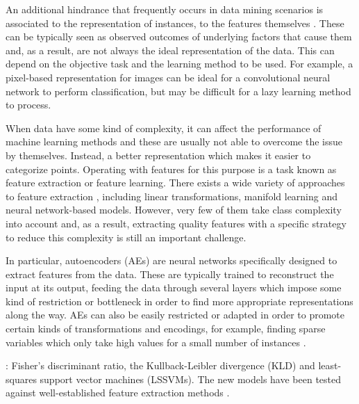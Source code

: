 An additional hindrance that frequently occurs in data mining scenarios is associated to the representation of instances, to the features themselves . These can be typically seen as observed outcomes of underlying factors that cause them and, as a result, are not always the ideal representation of the data. This can depend on the objective task and the learning method to be used. For example, a pixel-based representation for images can be ideal for a convolutional neural network to perform classification, but may be difficult for a lazy learning method to process.

When data have some kind of complexity, it can affect the performance of machine learning methods and these are usually not able to overcome the issue by themselves. Instead,  a better representation which makes it easier to categorize points. Operating with features for this purpose is a task known as feature extraction or feature learning. There exists a wide variety of approaches to feature extraction , including linear transformations, manifold learning and neural network-based models. However, very few of them take class complexity into account and, as a result, extracting quality features with a specific strategy to reduce this complexity is still an important challenge.

In particular, autoencoders (AEs)  are neural networks specifically designed to extract features from the data. These are typically trained to reconstruct the input at its output, feeding the data through several layers which impose some kind of restriction or bottleneck in order to find more appropriate representations along the way. AEs can also be easily restricted or adapted in order to promote certain kinds of transformations and encodings, for example, finding sparse variables which only take high values for a small number of instances .

: Fisher's discriminant ratio, the Kullback-Leibler divergence (KLD) and least-squares support vector machines (LSSVMs). The new models have been tested against well-established feature extraction methods .

